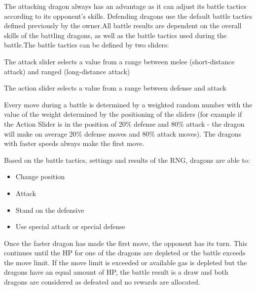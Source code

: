 \documentclass[12pt]{article}
\begin{document}
The attacking dragon always has an advantage as it can adjust its battle tactics according to its opponent’s skills. Defending dragons use the default battle tactics defined previously by the owner.All battle results are dependent on the overall skills of the battling dragons, as well as the battle tactics used during the battle.The battle tactics can be defined by two sliders:


\begin{itemize}
  \begin{samepage}
    \item The attack slider selects a value from a range between melee (short-distance attack) and ranged (long-distance attack)
    \item The action slider selects a value from a range between defense and attack
   \end{samepage}
\end{itemize}

Every move during a battle is determined by a weighted random number with the value of the weight determined by the positioning of the sliders (for example if the Action Slider is in the position of 20$\%$  defense and 80$\%$  attack - the dragon will make on average 20$\%$  defense moves and 80$\%$  attack moves). The dragons with faster speeds always make the first move.\par

\begin{samepage}
 Based on the battle tactics, settings and results of the RNG, dragons are able to:\par
 \begin{itemize}
    \item Change position
          \item Attack
          \item Stand on the defensive
          \item Use special attack or special defense
  \end{itemize}
\end{samepage}

Once the faster dragon has made the first move, the opponent has its turn. This continues until the HP for one of the dragons are depleted or the battle exceeds the move limit. If the move limit is exceeded or available gas is depleted but the dragons have an equal amount of HP, the battle result is a draw and both dragons are considered as defeated and no rewards are allocated.\par
\end{document}
